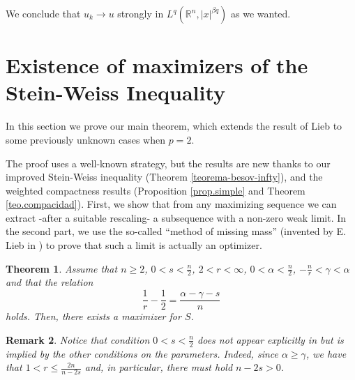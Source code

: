 \documentclass[12pt]{amsart}
\newcommand {\R}{\mathbb{R}}
\newtheorem{theorem}{Theorem}[section]
\newtheorem{remark}[theorem]{Remark}
\begin{document}
We conclude that $u_k \to u$ strongly in $L^q(\R^n,|x|^{\beta q})$ as we wanted.

\section{Existence of maximizers of the Stein-Weiss Inequality}

In this section we prove our main theorem, which extends the result of Lieb  \cite[Theorem 5.1]{Lieb} to some previously unknown cases when $p=2$. 

The proof uses a well-known strategy, but the results are new thanks to our improved Stein-Weiss inequality (Theorem \ref{teorema-besov-infty}),  and the weighted compactness results  (Proposition \ref{prop.simple} and Theorem \ref{teo.compacidad}). First, we show that from any maximizing sequence we can extract -after a suitable rescaling- a subsequence with a non-zero weak limit. In the second part, we use the so-called ``method of missing mass'' (invented by E. Lieb in \cite{Lieb}) to prove that such a limit is actually an optimizer.   

\begin{theorem} \label{existence-of-maximizers}
Assume that $n\geq 2$, $0<s<\frac{n}{2}$, $2<r<\infty$, $0<\alpha<\frac{n}{2}$, $-\frac{n}{r}<\gamma < \alpha$ and that the relation
$$
	\frac{1}{r}-\frac{1}{2}=\frac{\alpha-\gamma-s}{n}
$$
holds. Then, there exists a maximizer for $S$.
\end{theorem}

\begin{remark}
Notice that condition $0<s<\frac{n}{2}$ does not appear explicitly in  \cite[Theorem 5.1]{Lieb} but is implied by the other conditions on the parameters. Indeed, since $\alpha\ge \gamma$, we have that $1<r\le \frac{2n}{n-2s}$ and, in particular, there must hold $n-2s> 0$.
\end{remark}
\end{document}
